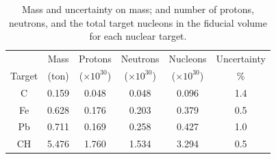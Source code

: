 \begingroup
\squeezetable
\begin{table}
\begin{tabular}{cccccc}
\hline \hline
& Mass  & Protons             & Neutrons           & Nucleons & Uncertainty\\
Target & (ton) &  ($\times 10^{30}$) & ($\times 10^{30}$) & ($\times 10^{30}$) & \% \\
    \hline
    C  & 0.159 & 0.048 & 0.048 & 0.096 & 1.4 \\
    Fe & 0.628 & 0.176 & 0.203 & 0.379 & 0.5 \\
    Pb & 0.711 & 0.169 & 0.258 & 0.427 & 1.0 \\
    CH & 5.476 & 1.760 & 1.534 & 3.294 & 0.5 \\
      \hline \hline
      \end{tabular}
      \caption{Mass and uncertainty on mass; and number of protons, neutrons, and the total target nucleons in the fiducial volume for each nuclear target.}
      \label{tab:NumberOfTargets}
      \end{table}
      \endgroup
